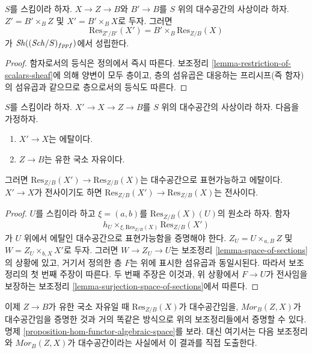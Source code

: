 \begin{lemma}
\label{lemma-etale-base-change-restriction-of-scalars}
$S$를 스킴이라 하자. $X \to Z \to B$와 $B' \to B$를
$S$ 위의 대수공간의 사상이라 하자. $Z' = B' \times_B Z$ 및
$X' = B' \times_B X$로 두자. 그러면
$$
\text{Res}_{Z'/B'}(X')
=
B' \times_B \text{Res}_{Z/B}(X)
$$
가 $\mathop{\mathit{Sh}}\nolimits((\mathit{Sch}/S)_{fppf})$에서 성립한다.
\end{lemma}

\begin{proof}
함자로서의 등식은 정의에서 즉시 따른다. 보조정리
\ref{lemma-restriction-of-scalars-sheaf}에 의해 양변이 모두 층이고,
층의 섬유곱은 대응하는 프리시프(즉 함자)의 섬유곱과 같으므로
층으로서의 등식도 따른다.
\end{proof}

\begin{lemma}
\label{lemma-etale-covering-restriction-of-scalars}
$S$를 스킴이라 하자. $X' \to X \to Z \to B$를
$S$ 위의 대수공간의 사상이라 하자. 다음을 가정하자.
\begin{enumerate}
\item $X' \to X$는 에탈이다.
\item $Z \to B$는 유한 국소 자유이다.
\end{enumerate}
그러면 $\text{Res}_{Z/B}(X') \to \text{Res}_{Z/B}(X)$는
대수공간으로 표현가능하고 에탈이다. $X' \to X$가 전사이기도 하면
$\text{Res}_{Z/B}(X') \to \text{Res}_{Z/B}(X)$는 전사이다.
\end{lemma}

\begin{proof}
$U$를 스킴이라 하고 $\xi = (a, b)$를
$\text{Res}_{Z/B}(X)(U)$의 원소라 하자. 함자
$$
h_U \times_{\xi, \text{Res}_{Z/B}(X)} \text{Res}_{Z/B}(X')
$$
가 $U$ 위에서 에탈인 대수공간으로 표현가능함을 증명해야 한다.
$Z_U = U \times_{a, B} Z$ 및 $W = Z_U \times_{b, X} X'$로 두자.
그러면 $W \to Z_U \to U$는 보조정리
\ref{lemma-space-of-sections}의 상황에 있고, 거기서 정의한 층 $F$는
위에 표시한 섬유곱과 동일시된다. 따라서 보조정리의 첫 번째 주장이
따른다. 두 번째 주장은 이것과, 위 상황에서 $F \to U$가 전사임을
보장하는 보조정리 \ref{lemma-surjection-space-of-sections}에서 따른다.
\end{proof}

\noindent
이제 $Z \to B$가 유한 국소 자유일 때 $\text{Res}_{Z/B}(X)$가
대수공간임을, $\mathit{Mor}_B(Z, X)$가 대수공간임을 증명한 것과
거의 똑같은 방식으로 위의 보조정리들에서 증명할 수 있다.
명제 \ref{proposition-hom-functor-algebraic-space}를 보라.
대신 여기서는 다음 보조정리와 $\mathit{Mor}_B(Z, X)$가 대수공간이라는
사실에서 이 결과를 직접 도출한다.

